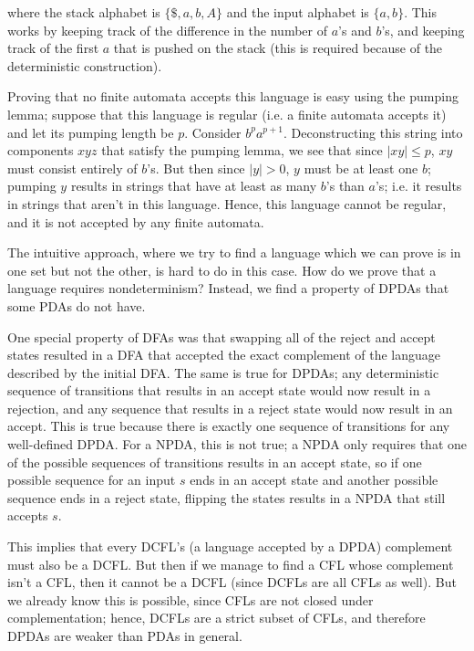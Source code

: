 \documentclass[solution, letterpaper]{cs121}
\begin{document}
\begin{solution}
where the stack alphabet is $\{\$, a, b, A\}$ and the input alphabet is $\{a, b\}$.  This works by keeping track of the difference in the number of $a$'s and $b$'s, and keeping track of the first $a$ that is pushed on the stack (this is required because of the deterministic construction).

Proving that no finite automata accepts this language is easy using the pumping lemma; suppose that this language is regular (i.e. a finite automata accepts it) and let its pumping length be $p$.  Consider $b^pa^{p+1}$.  Deconstructing this string into components $xyz$ that satisfy the pumping lemma, we see that since $|xy| \le p$, $xy$ must consist entirely of $b$'s.  But then since $|y| > 0$, $y$ must be at least one $b$; pumping $y$ results in strings that have at least as many $b$'s than $a$'s; i.e. it results in strings that aren't in this language.  Hence, this language cannot be regular, and it is not accepted by any finite automata.

\subsolution The intuitive approach, where we try to find a language which we can prove is in one set but not the other, is hard to do in this case.  How do we prove that a language requires nondeterminism?  Instead, we find a property of DPDAs that some PDAs do not have.

One special property of DFAs was that swapping all of the reject and accept states resulted in a DFA that accepted the exact complement of the language described by the initial DFA.  The same is true for DPDAs; any deterministic sequence of transitions that results in an accept state would now result in a rejection, and any sequence that results in a reject state would now result in an accept.  This is true because there is exactly one sequence of transitions for any well-defined DPDA.  For a NPDA, this is not true; a NPDA only requires that one of the possible sequences of transitions results in an accept state, so if one possible sequence for an input $s$ ends in an accept state and another possible sequence ends in a reject state, flipping the states results in a NPDA that still accepts $s$.  

This implies that every DCFL's (a language accepted by a DPDA) complement must also be a DCFL.  But then if we manage to find a CFL whose complement isn't a CFL, then it cannot be a DCFL (since DCFLs are all CFLs as well).  But we already know this is possible, since CFLs are not closed under complementation; hence, DCFLs are a strict subset of CFLs, and therefore DPDAs are weaker than PDAs in general.
\end{solution}
\end{document}
